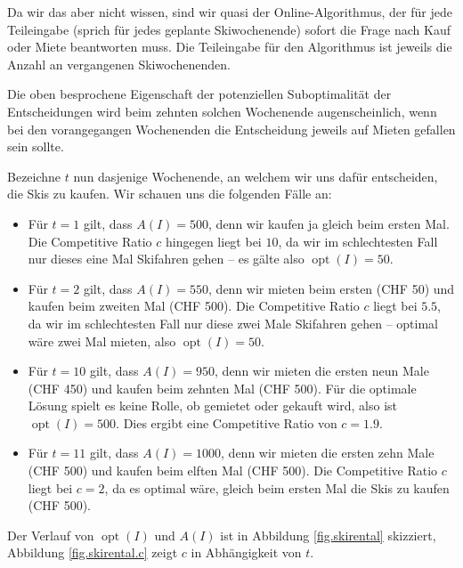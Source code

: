 \documentclass[11pt,abstracton]{scrreprt} %
\theoremstyle{definition}
\begin{document}
\bigskip
Da wir das aber nicht wissen, sind wir quasi der Online-Algorithmus, der für jede Teileingabe (sprich für jedes geplante Skiwochenende) sofort die Frage nach Kauf oder Miete beantworten muss. Die Teileingabe für den Algorithmus ist jeweils die Anzahl an vergangenen Skiwochenenden.

Die oben besprochene Eigenschaft der potenziellen Suboptimalität der Entscheidungen wird beim zehnten solchen Wochenende augenscheinlich, wenn bei den vorangegangen Wochenenden die Entscheidung jeweils auf Mieten gefallen sein sollte.

\bigskip
Bezeichne $t$ nun dasjenige Wochenende, an welchem wir uns dafür entscheiden, die Skis zu kaufen. Wir schauen uns die folgenden Fälle an:

\begin{itemize}
\item Für $t = 1$ gilt, dass $A(I) = 500$, denn wir kaufen ja gleich beim ersten Mal. Die Competitive Ratio $c$ hingegen liegt bei $10$, da wir im schlechtesten Fall nur dieses eine Mal Skifahren gehen -- es gälte also $\operatorname{opt}(I) = 50$.

\item Für $t = 2$ gilt, dass $A(I) = 550$, denn wir mieten beim ersten (CHF 50) und kaufen beim zweiten Mal (CHF 500). Die Competitive Ratio $c$ liegt bei $5.5$, da wir im schlechtesten Fall nur diese zwei Male Skifahren gehen -- optimal wäre zwei Mal mieten, also  $\operatorname{opt}(I) = 50$.

\item Für $t = 10$ gilt, dass $A(I) = 950$, denn wir mieten die ersten neun Male (CHF 450) und kaufen beim zehnten Mal (CHF 500). Für die optimale Lösung spielt es keine Rolle, ob gemietet oder gekauft wird, also ist $\operatorname{opt}(I) = 500$. Dies ergibt eine Competitive Ratio von $c = 1.9$.

\item Für $t = 11$ gilt, dass $A(I) = 1000$, denn wir mieten die ersten zehn Male (CHF 500) und kaufen beim elften Mal (CHF 500). Die Competitive Ratio $c$ liegt bei $c = 2$, da es optimal wäre, gleich beim ersten Mal die Skis zu kaufen (CHF 500).
\end{itemize}

Der Verlauf von $\operatorname{opt}(I)$ und $A(I)$ ist in Abbildung \ref{fig.skirental} skizziert, Abbildung \ref{fig.skirental.c} zeigt $c$ in Abhängigkeit von $t$.
\end{document}
